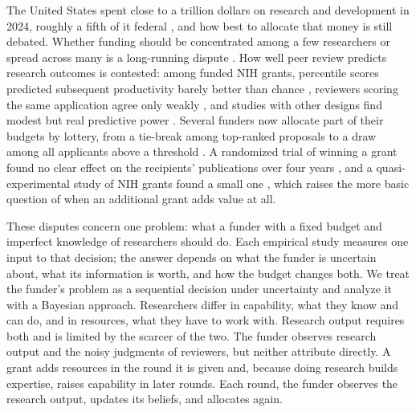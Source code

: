 \documentclass[article, 11pt, reqno]{amsart}
\theoremstyle{named}
\begin{document}
The United States spent close to a trillion dollars on research and development in 2024, roughly a fifth of it federal \citep{NCSES2026, NSB2026}, and how best to allocate that money is still debated. Whether funding should be concentrated among a few researchers or spread across many is a long-running dispute \citep{FortinCurrie2013, Mongeon2016, Aagaard2020, Lauer2021}. How well peer review predicts research outcomes is contested: among funded NIH grants, percentile scores predicted subsequent productivity barely better than chance \citep{Fang2016}, reviewers scoring the same application agree only weakly \citep{Pier2018}, and studies with other designs find modest but real predictive power \citep{LiAgha2015, ParkLeeKim2015, LindnerNakamura2015}. Several funders now allocate part of their budgets by lottery, from a tie-break among top-ranked proposals to a draw among all applicants above a threshold \citep{Liu2020, Heyard2022, Feliciani2024}. A randomized trial of winning a grant found no clear effect on the recipients' publications over four years \citep{Barnett2024}, and a quasi-experimental study of NIH grants found a small one \citep{JacobLefgren2011}, which raises the more basic question of when an additional grant adds value at all.

These disputes concern one problem: what a funder with a fixed budget and imperfect knowledge of researchers should do. Each empirical study measures one input to that decision; the answer depends on what the funder is uncertain about, what its information is worth, and how the budget changes both. We treat the funder's problem as a sequential decision under uncertainty and analyze it with a Bayesian approach. Researchers differ in capability, what they know and can do, and in resources, what they have to work with. Research output requires both and is limited by the scarcer of the two. The funder observes research output and the noisy judgments of reviewers, but neither attribute directly. A grant adds resources in the round it is given and, because doing research builds expertise, raises capability in later rounds. Each round, the funder observes the research output, updates its beliefs, and allocates again.
\end{document}
